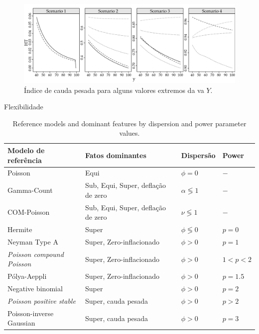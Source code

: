 \documentclass[10pt, aspectratio=169]{beamer}\usepackage[]{graphicx}\usepackage[]{color}
\begin{document}

\begin{frame}[fragile]
\begin{figure}[h]
\includegraphics[scale=0.6]{images/heavytail-1.png}
\caption{Índice de cauda pesada para alguns valores extremos da va $Y$.}
\label{Fig3}
\centering
\end{figure}
\end{frame}


\begin{frame}[fragile]{Flexibilidade}
\begin{table}[h]
\centering
\caption{Reference models and dominant features by dispersion and power parameter values.}
\label{tab:model}
\begin{tabular}{llll} \hline
Modelo de referência     & Fatos dominantes                     & Dispersão           & Power   \\ \hline
Poisson                  & Equi                                 & $\phi = 0$          & $-$      \\
Gamma-Count              & Sub, Equi, Super, deflação de zero   & $\alpha \lessgtr 1$ & $-$ \\
COM-Poisson              & Sub, Equi, Super, deflação de zero   & $\nu \lessgtr 1$    & $-$ \\
Hermite                  & Super                                & $\phi\lessgtr 0$    & $p = 0$   \\
Neyman Type A            & Super, Zero-inflacionado             & $\phi > 0$          & $p = 1$ \\
\textit{Poisson compound Poisson} & Super, Zero-inflacionado    & $\phi > 0$ & $1 < p < 2$ \\
P\'olya-Aeppli           & Super, Zero-inflacionado             & $\phi > 0$ & $p = 1.5$ \\
Negative binomial        & Super                                & $\phi > 0$ & $p = 2$ \\
\textit{Poisson positive stable}  & Super, cauda pesada         & $\phi > 0$       & $p > 2$ \\
Poisson-inverse Gaussian & Super, cauda pesada                  & $\phi > 0$       & $p = 3$ \\ \hline
\end{tabular}
\end{table}
\end{frame}
\end{document}

